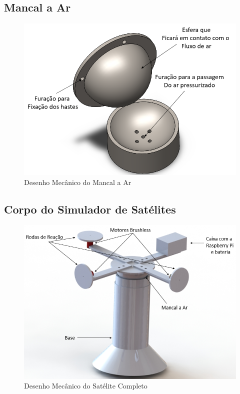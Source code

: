 \subsection{Mancal a Ar}

\begin{figure}[H]
  \caption{Desenho Mecânico do Mancal a Ar}
  \begin{center}
      \includegraphics[scale=.45]{img/base_desenho}
  \end{center}
  \label{fig:base_desenho}
\end{figure}


\subsection{Corpo do Simulador de Satélites}

\begin{figure}[H]
  \caption{Desenho Mecânico do Satélite Completo}
  \begin{center}
      \includegraphics[scale=.75]{img/satelite_completo}
  \end{center}
  \label{fig:satelite_completo}
\end{figure}

